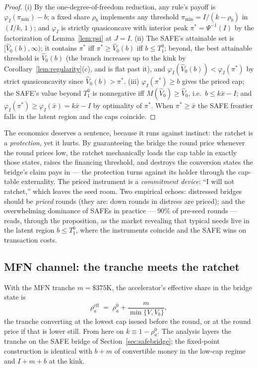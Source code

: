 \documentclass[11pt]{article}
\theoremstyle{definition}
\newcommand{\pimin}{\pi_{\min}}
\begin{document}
\begin{proof}
(i) By the one-degree-of-freedom reduction, any rule's payoff is $\varphi_I(\pimin)-b$; a fixed share $\rho_b$ implements any threshold $\pimin=I/(k-\rho_b)$ in $(I/k,\,1)$; and $\varphi_I$ is strictly quasiconcave with interior peak $\pi^{*}=\Psi^{-1}(I)$ by the factorization of Lemma~\ref{lem:psi} at $J=I$. (ii) The SAFE's attainable set is $[\hat V_0(b),\infty)$; it contains $\pi^{*}$ iff $\pi^{*}\ge\hat V_0(b)$ iff $b\le T_1^{0}$; beyond, the best attainable threshold is $\hat V_0(b)$ (the branch increases up to the kink by Corollary~\ref{lem:regularity}(c), and is flat past it), and $\varphi_I(\hat V_0(b))<\varphi_I(\pi^{*})$ by strict quasiconcavity since $\hat V_0(b)>\pi^{*}$. (iii) $\varphi_I(\pi^{*})\ge b$ gives the priced cap; the SAFE's value beyond $T_1^{0}$ is nonnegative iff $M(\hat V_0)\ge\hat V_0$, i.e.\ $b\le k\bar x-I$; and $\varphi_I(\pi^{*})\ge\varphi_I(\bar x)=k\bar x-I$ by optimality of $\pi^{*}$. When $\pi^{*}\ge\bar x$ the SAFE frontier falls in the latent region and the caps coincide.
\end{proof}

The economics deserves a sentence, because it runs against instinct: the ratchet is a \emph{protection}, yet it hurts. By guaranteeing the bridge the round price whenever the round prices low, the ratchet mechanically loads the cap table in exactly those states, raises the financing threshold, and destroys the conversion states the bridge's claim pays in --- the protection turns against its holder through the cap-table externality. The priced instrument is a \emph{commitment device}: ``I will not ratchet,'' which leaves the seed room. Two empirical echoes: distressed bridges should be \emph{priced} rounds (they are: down rounds in distress are priced); and the overwhelming dominance of SAFEs in practice --- $90\%$ of pre-seed rounds --- reads, through the proposition, as the market revealing that typical needs live in the latent region $b\le T_1^{0}$, where the instruments coincide and the SAFE wins on transaction costs.

\subsection{MFN channel: the tranche meets the ratchet}\label{sec:mfnchannel}

With the MFN tranche $m=\$375$K, the accelerator's effective share in the bridge state is
\begin{equation}
\rho_a^{\mathrm{eff}} \;=\; \rho_a^{0} + \frac{m}{\min\{V, V_b\}},
\label{eq:rhoeff}
\end{equation}
the tranche converting at the lowest cap issued before the round, or at the round price if that is lower still. From here on $k\equiv1-\rho_a^{0}$. The analysis layers the tranche on the SAFE bridge of Section~\ref{sec:safebridge}; the fixed-point construction is identical with $b+m$ of convertible money in the low-cap regime and $I+m+b$ at the kink.
\end{document}
